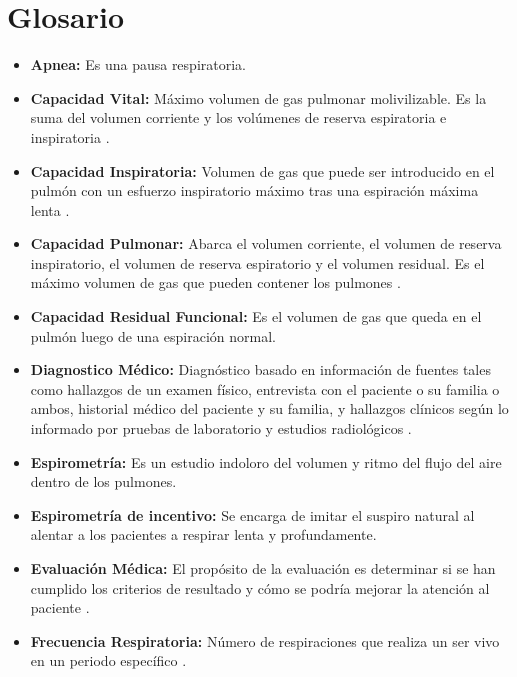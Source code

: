 \documentclass[12pt]{article}
\begin{document}
\newpage


\section*{Glosario}
\begin{itemize}


\item \textbf{Apnea:} Es una pausa respiratoria.
\item \textbf{Capacidad Vital:} Máximo volumen de gas pulmonar molivilizable. Es la suma del volumen corriente y los volúmenes de reserva espiratoria e inspiratoria \cite{19}. 
\item \textbf{Capacidad Inspiratoria:} Volumen de gas que puede ser introducido en el pulmón con un esfuerzo inspiratorio máximo tras una espiración máxima lenta \cite{19}.
\item \textbf{Capacidad Pulmonar:} Abarca el volumen corriente, el volumen de reserva inspiratorio, el volumen de reserva espiratorio y el volumen residual. Es el máximo volumen de gas que pueden contener los pulmones \cite{19}.
\item \textbf{Capacidad Residual Funcional:} Es el volumen de gas que queda en el pulmón luego de una espiración normal\cite{19}.
\item \textbf{Diagnostico Médico:} Diagnóstico basado en información de fuentes tales como hallazgos de un examen físico, entrevista con el paciente o su familia o ambos, historial médico del paciente y su familia, y hallazgos clínicos según lo informado por pruebas de laboratorio y estudios radiológicos \cite{4}.
\item \textbf{Espirometría:} Es un estudio indoloro del volumen y ritmo del flujo del aire dentro de los pulmones.
\item \textbf{Espirometría de incentivo:} Se encarga de imitar el suspiro natural al alentar a los pacientes a respirar lenta y profundamente.
\item \textbf{Evaluación Médica:} El propósito de la evaluación es determinar si se han cumplido los criterios de resultado y cómo se podría mejorar la atención al paciente \cite{4}.

\item \textbf{Frecuencia Respiratoria:} Número de respiraciones que realiza un ser vivo en un periodo específico \cite{1}. 



\end{itemize}
\end{document}
